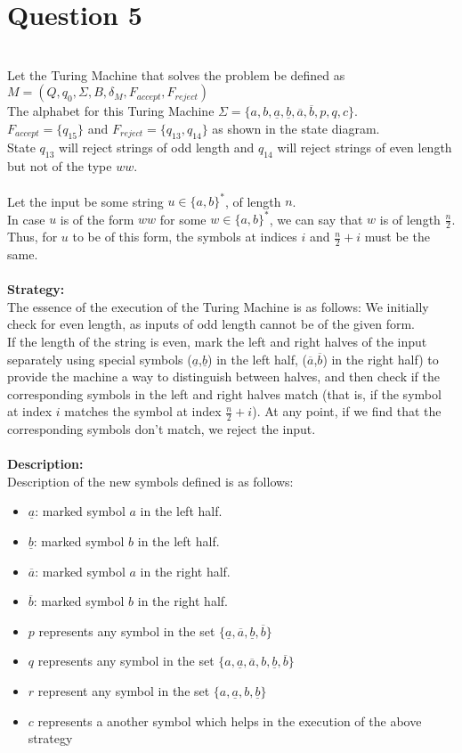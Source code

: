 \documentclass[12pt,a4paper]{article}
\begin{document}
\section{Question 5}
\\Let the Turing Machine that solves the problem be defined as $M = (Q,q_0,\Sigma,B,\delta_M,F_{accept},F_{reject})$
\\The alphabet for this Turing Machine $\Sigma = \{a,b,\underline{a},\underline{b}, \overline{a},\overline{b},p,q,c\}$.
\\$F_{accept} = \{q_{15}\} $ and $F_{reject} = \{q_{13},q_{14}\}$ as shown in the state diagram.
\\State $q_{13}$ will reject strings of odd length and $q_{14}$ will reject strings of even length but not of the type $ww$.
\\
\\Let the input be some string $u \in \{a,b\}^*$, of length $n$.
\\In case $u$ is of the form $ww$ for some $w \in \{a,b\}^*$, we can say that $w$ is of length $\frac{n}{2}$. Thus, for $u$ to be of this form, the symbols at indices $i$ and $\frac{n}{2} + i$ must be the same.
\\
\\\textbf{Strategy:}
\\The essence of the execution of the Turing Machine is as follows: We initially check for even length, as inputs of odd length cannot be of the given form.
\\If the length of the string is even, mark the left and right halves of the input separately using special symbols ($\underline{a}$,$\underline{b}$) in the left half, ($\overline{a}$,$\overline{b}$) in the right half) to provide the machine a way to distinguish between halves, and then check if the corresponding symbols in the left and right halves match (that is, if the symbol at index $i$ matches the symbol at index $\frac{n}{2} + i$). At any point, if we find that the corresponding symbols don't match, we reject the input.
\\
\\\textbf{Description:}
\\Description of the new symbols defined is as follows:
\begin{itemize}
    \item $\underline{a}$: marked symbol $a$ in the left half.
    \item $\underline{b}$: marked symbol $b$ in the left half.
    \item $\overline{a}$: marked symbol $a$ in the right half.
    \item $\overline{b}$: marked symbol $b$ in the right half.
    \item $p$ represents any symbol in the set $ \{\underline{a},\overline{a},\underline{b},\overline{b}\}$
    \item $q$ represents any symbol in the set $\{a,\underline{a},\overline{a},b,\underline{b},\overline{b}\}$
    \item $r$ represent any symbol in the set ${\{a,\underline{a},b,\underline{b}\}}$
    \item $c$ represents a another symbol which helps in the execution of the above strategy
\end{itemize}
\end{document}
